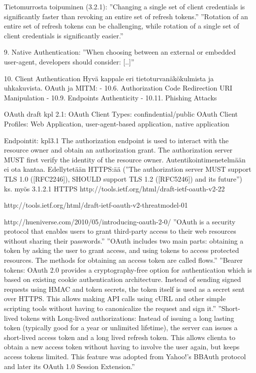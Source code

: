 \documentclass[finnish,gradu]{tktltiki}
\begin{document}
  Tietomurrosta toipuminen (3.2.1):
  ''Changing a single set of client credentials is significantly faster than revoking an entire set of refresh tokens.''
  ''Rotation of an entire set of refresh tokens can be challenging, while rotation of a single set of client credentials is significantly easier.''

  9. Native Authentication:
  ''When choosing between an external or embedded user-agent, developers should consider: [..]''

  10. Client Authentication
  Hyvä kappale eri tietoturvanäkökulmista ja uhkakuvista.
  OAuth ja MITM:
  - 10.6.  Authorization Code Redirection URI Manipulation
  - 10.9.  Endpoints Authenticity
  - 10.11.  Phishing Attacks


  OAuth draft kpl 2.1:
  OAuth Client Types: confindential/public
  OAuth Client Profiles: Web Application, user-agent-based application, native application

  Endpointit: kpl3.1
   The authorization endpoint is used to interact with the resource
      owner and obtain an authorization grant.  The authorization server
      MUST first verify the identity of the resource owner.
   Autentikointimenetelmään ei ota kantaa.
   Edellytetään HTTPS:ää (''The authorization server MUST support TLS 1.0 ([RFC2246]), SHOULD support TLS 1.2 ([RFC5246]) and its future'')
   ks. myös 3.1.2.1 HTTPS
  http://tools.ietf.org/html/draft-ietf-oauth-v2-22

  http://tools.ietf.org/html/draft-ietf-oauth-v2-threatmodel-01

  http://hueniverse.com/2010/05/introducing-oauth-2-0/
  ''OAuth is a security protocol that enables users to grant third-party access to their web resources without sharing their passwords.''
  ''OAuth includes two main parts: obtaining a token by asking the user to grant access, and using tokens to access protected resources. The methods for obtaining an access token are called flows.''
  ''Bearer tokens: OAuth 2.0 provides a cryptography-free option for authentication which is based on existing cookie authentication architecture. Instead of sending signed requests using HMAC and token secrets, the token itself is used as a secret sent over HTTPS. This allows making API calls using cURL and other simple scripting tools without having to canonicalize the request and sign it.''
  ''Short-lived tokens with Long-lived authorizations: Instead of issuing a long lasting token (typically good for a year or unlimited lifetime), the server can issues a short-lived access token and a long lived refresh token. This allows clienta to obtain a new access token without having to involve the user again, but keeps access tokens limited. This feature was adopted from Yahoo!’s BBAuth protocol and later its OAuth 1.0 Session Extension.''
\end{document}
